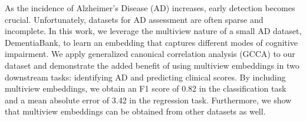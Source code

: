 As the incidence of Alzheimer's Disease (AD) increases, early detection becomes crucial. Unfortunately, datasets for AD assessment are often sparse and incomplete. In this work, we leverage the multiview nature of a small AD dataset, DementiaBank, to learn an embedding that captures different modes of cognitive impairment. We apply generalized canonical correlation analysis (GCCA) to our dataset and demonstrate the added benefit of using multiview embeddings in two downstream tasks: identifying AD and predicting clinical scores. By including multiview embeddings, we obtain an F1 score of 0.82 in the classification task and a mean absolute error of 3.42 in the regression task. Furthermore, we show that multiview embeddings can be obtained from other datasets as well.
